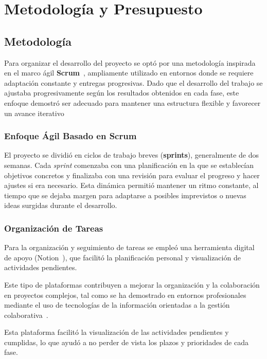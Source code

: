 
\chapter{Metodología y Presupuesto}\label{ch:metodologia-y-presupuesto}
\section{Metodología}\label{sec:metodologia}
Para organizar el desarrollo del proyecto se optó por una metodología inspirada en el marco ágil
\textbf{Scrum}~\cite{ScrumGuide}, ampliamente utilizado en entornos donde se requiere adaptación constante y
entregas progresivas.
Dado que el desarrollo del trabajo se ajustaba progresivamente según los resultados obtenidos en cada fase,
este enfoque demostró ser adecuado para mantener una estructura flexible y favorecer un avance iterativo

\subsection{Enfoque Ágil Basado en Scrum}\label{subsec:enfoque-agil-basado-en-scrum}
El proyecto se dividió en ciclos de trabajo breves (\textbf{sprints}), generalmente de dos semanas.
Cada \textit{sprint} comenzaba con una planificación en la que se establecían objetivos concretos y finalizaba con una revisión
para evaluar el progreso y hacer ajustes si era necesario.
Esta dinámica permitió mantener un ritmo constante, al tiempo que se dejaba margen para adaptarse a posibles
imprevistos o nuevas ideas surgidas durante el desarrollo.

\subsection{Organización de Tareas}\label{subsec:organizacion-de-tareas}
Para la organización y seguimiento de tareas se empleó una herramienta digital de apoyo (Notion~\cite{NotionGestionTareas}),
que facilitó la planificación personal y visualización de actividades pendientes.


Este tipo de plataformas contribuyen a mejorar la organización y la colaboración en proyectos complejos,
tal como se ha demostrado en entornos profesionales mediante el uso de tecnologías de la información orientadas a la gestión colaborativa~\cite{EnhancingCollaborationProjectbased}.


Esta plataforma facilitó la visualización de las actividades pendientes y cumplidas, lo que ayudó a no perder de vista
los plazos y prioridades de cada fase.


